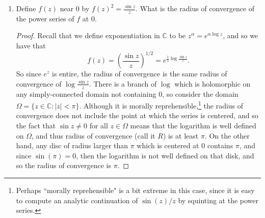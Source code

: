 \documentclass{article}
\begin{document}
\begin{enumerate}
\begin{proof}[Proof. (Riemann-Hurwitz theorem)]
\begin{align*}
		\frac{z^3}{z^3-1} &= w^3.
	\end{align*}
	In a neighbor of zero there are three distinct cube root functions we could use to solve for $w$, and so there
	is no ramification at $\infty$.
	Then we are only left with the line $(0,0) \leftrightarrow (3,1)$, which has slope $1/3$ and so the ramification
	index is $3$.
	Thus, we have a set of ramification points given by $\{1, \xi, \xi^2\}$, and each of them has ramification index $3$.
	The Riemann-Hurwitz formula relates the genus of $Y = \{(z,w):z^3+w^3=1\}$ to the genus of $\mathbb{CP}^1$
	by
	\[ 2 g_Y - 2 = n(2g_{\mathbb{CP}^1} - 2) + \sum_{z \in \{1, \xi, \xi^2\}} (e_{z} - 1)  \]
	where $n$ is the degree of the covering, so we get that 
	\begin{align*}
	2 g_Y - 2 &= 3(2 \cdot 0 - 2) + 3 \cdot (3-1) \\
	&= -6 + 6 = 0\\
	\Rightarrow g_y &= 1
	\end{align*}
	Since the genus is $1$, $Y$ is an elliptic curve.
	\end{proof}
	
	\setcounter{enumi}{7}
	
	\item Define $f(z)$ near $0$ by $f(z)^2 = \frac{\sin z}{z}$. What is the radius of convergence of the power series of $f$ at $0$.
	
	\begin{proof}
		Recall that we define exponentiation in $\mathbb{C}$ to be $z^\alpha = e^{\alpha \log z}$, and so we have that 
		\[f(z) = \left(  \frac{\sin z}{z} \right)^{1/2} =e^{\frac12\log \frac{\sin z}{z}}.\]
		So since $e^z$ is entire, the radius of convergence is the same radius of convergence of $\log \frac{\sin z}{z}$.
		There is a branch of $\log$ which is holomorphic on any simply-connected domain not containing $0$, 
		so consider the domain $\Omega = \{ z \in \mathbb{C} : |z| < \pi\}$. 
		Although it is morally reprehensible,\footnote{Perhaps ``morally reprehensible" is a bit extreme in this case, since it is
		easy to compute an analytic continuation of $\sin(z)/z$ by squinting at the power series.} the
		radius of convergence does not include the point at which the series is centered, and so the fact that
		$\sin{z} \neq 0$ for all $z \in \Omega$ means that the logarithm is well defined on $\Omega$, and thus
		radius of convergence (call it $R$) is at least $\pi$.
		On the other hand, any disc of radius larger than $\pi$ which is centered at $0$ contains $\pi$, and since
		$\sin(\pi) = 0$, then the logarithm is not well defined on that disk, and so
		the radius of convergence is $\pi$.
	\end{proof}
\end{enumerate}
\end{document}
